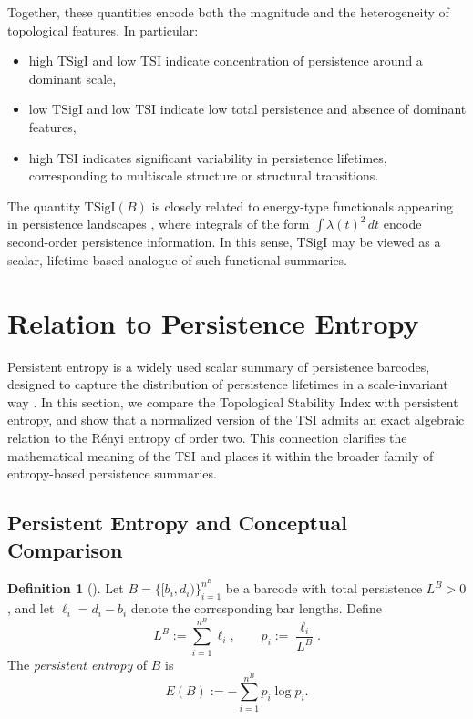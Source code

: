 \documentclass[11pt]{amsart}
\theoremstyle{definition}
\newtheorem{definition}{Definition}[section]
\begin{document}
Together, these quantities encode both the magnitude and the heterogeneity of topological features. In particular:
\begin{itemize}
    \item[-] high $\mathrm{TSigI}$ and low $\mathrm{TSI}$ indicate concentration of persistence around a dominant scale,
    \item[-] low $\mathrm{TSigI}$ and low $\mathrm{TSI}$ indicate low total persistence and absence of dominant features,
    \item[-] high $\mathrm{TSI}$ indicates significant variability in persistence lifetimes, corresponding to multiscale structure or structural transitions.
\end{itemize}

The quantity $\mathrm{TSigI}(B)$ is closely related to energy-type functionals appearing in persistence landscapes \cite{bubenik_statistical_2015}, where integrals of the form $\int \lambda(t)^2 \, dt$ encode second-order persistence information. In this sense, $\mathrm{TSigI}$ may be viewed as a scalar, lifetime-based analogue of such functional summaries.

\section{Relation to Persistence Entropy}\label{Sec:Relation to Persistence Entropy}
Persistent entropy is a widely used scalar summary of persistence barcodes, designed to capture the distribution of persistence lifetimes in a scale-invariant way \cite{rucco_characterisation_2016,atienza_persistent_2019,atienza_stability_2020}. In this section, we compare the Topological Stability Index with persistent entropy, and show that a normalized version of the TSI admits an exact algebraic relation to the Rényi entropy of order two. This connection clarifies the mathematical meaning of the TSI and places it within the broader family of entropy-based persistence summaries.



\subsection{Persistent Entropy and Conceptual Comparison}


\begin{definition}[\cite{atienza_persistent_2019}]
Let $B=\{[b_i,d_i)\}_{i=1}^{n^B}$ be a barcode with total persistence $L^B>0$, and let $\ell_i=d_i-b_i$ denote the corresponding bar lengths. Define
\[
L^B:=\sum_{i=1}^{n^B}\ell_i,
\qquad
p_i:=\frac{\ell_i}{L^B}.
\]
The \emph{persistent entropy} of $B$ is
\begin{equation}
E(B):=-\sum_{i=1}^{n^B} p_i \log p_i.
\end{equation}
\end{definition}
\end{document}
